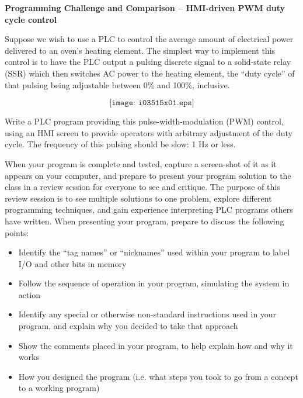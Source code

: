 

\noindent
{\bf Programming Challenge and Comparison -- HMI-driven PWM duty cycle control} 

\vskip 10pt

Suppose we wish to use a PLC to control the average amount of electrical power delivered to an oven's heating element.  The simplest way to implement this control is to have the PLC output a pulsing discrete signal to a solid-state relay (SSR) which then switches AC power to the heating element, the ``duty cycle'' of that pulsing being adjustable between 0\% and 100\%, inclusive.

$$\texttt{[image: i03515x01.eps]}$$

Write a PLC program providing this pulse-width-modulation (PWM) control, using an HMI screen to provide operators with arbitrary adjustment of the duty cycle.  The frequency of this pulsing should be slow: 1 Hz or less.

\vskip 10pt

When your program is complete and tested, capture a screen-shot of it as it appears on your computer, and prepare to present your program solution to the class in a review session for everyone to see and critique.  The purpose of this review session is to see multiple solutions to one problem, explore different programming techniques, and gain experience interpreting PLC programs others have written.  When presenting your program, prepare to discuss the following points:

\begin{itemize}
\item{} Identify the ``tag names'' or ``nicknames'' used within your program to label I/O and other bits in memory
\item{} Follow the sequence of operation in your program, simulating the system in action
\item{} Identify any special or otherwise non-standard instructions used in your program, and explain why you decided to take that approach
\item{} Show the comments placed in your program, to help explain how and why it works
\item{} How you designed the program (i.e. what steps you took to go from a concept to a working program)
\end{itemize}


